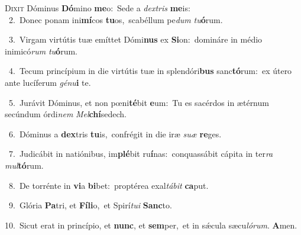\lettrine{\initial\textcolor{\initialcolor}{D}}{ixit} Dóminus \textbf{Dó}\-mino \textbf{me}\-o:~\star Sede a \textit{dex}\-\textit{tris} \textbf{me}\-is:\\
{\numbfont\textcolor{\numbcolor}{~2.}}~Donec ponam ini\-\textbf{mí}\-cos \textbf{tu}\-os,~\star scabéllum pe\textit{dum} \textit{tu}\-\textbf{ó}rum.\par
{\numbfont\textcolor{\numbcolor}{~3.}}~Virgam virtútis tuæ emíttet Dómi\textbf{nus} ex \textbf{Si}\-on:~\star domináre in médio inimicó\textit{rum} \textit{tu}\-\textbf{ó}rum.\par
{\numbfont\textcolor{\numbcolor}{~4.}}~Tecum princípium in die virtútis tuæ in splendóri\textbf{bus} sanc\-\textbf{tó}\-rum:~\star ex útero ante lucíferum \textit{gé}\-\textit{nu}\textbf{i} te.\par
{\numbfont\textcolor{\numbcolor}{~5.}}~Jurávit Dóminus, et non pœni\-\textbf{té}\-bit \textbf{e}\-um:~\star Tu es sacérdos in ætérnum secúndum órdi\textit{nem} \textit{Mel}\-\textbf{chí}sedech.\par
{\numbfont\textcolor{\numbcolor}{~6.}}~Dóminus a \textbf{dex}\-tris \textbf{tu}\-is,~\star confrégit in die iræ \textit{su}\-\textit{æ} \textbf{re}\-ges.\par
{\numbfont\textcolor{\numbcolor}{~7.}}~Judicábit in natiónibus, im\-\textbf{plé}\-bit ru\-\textbf{í}\-nas:~\star conquassábit cápita in ter\textit{ra} \textit{mul}\-\textbf{tó}rum.\par
{\numbfont\textcolor{\numbcolor}{~8.}}~De torrénte in \textbf{vi}\-a \textbf{bi}\-bet:~\star proptérea exal\-\textit{tá}\-\textit{bit} \textbf{ca}\-put.\par
{\numbfont\textcolor{\numbcolor}{~9.}}~Glória \textbf{Pa}\-tri, et \textbf{Fí}\-\textbf{li}o,~\star et Spirí\-\textit{tu}\-\textit{i} \textbf{Sanc}\-to.\par
{\numbfont\textcolor{\numbcolor}{10.}}~Sicut erat in princípio, et \textbf{nunc}\-, et \textbf{sem}\-per,~\star et in sǽcula sæcu\-\textit{ló}\-\textit{rum}. \textbf{A}\-men.\par
